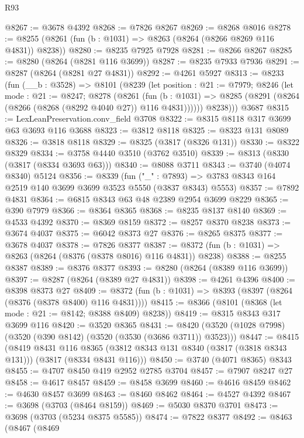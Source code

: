 \begin{lexlean}{R93}
\begin{coremodule}
@8267 := @3678 @4392
@8268 := @7826 @8267
@8269 := @8268 @8016
@8278 := @8255 (@8261 (fun (b : @1031) => @8263 (@8264 (@8266 @8269 @116 @4831)) @8238))
@8280 := @8235 @7925 @7928
@8281 := @8266 @8267
@8285 := @8280 (@8264 (@8281 @116 @3699))
@8287 := @8235 @7933 @7936
@8291 := @8287 (@8264 (@8281 @27 @4831))
@8292 := @4261 @5927
@8313 := @8233
    (fun (__b : @3528) =>
    @8101
      (@8239
        (let position : @21 := @7979;
        @8246
          (let mode : @21 := @8247;
          @8278
            (@8261
              (fun (b : @1031) =>
              @8285 (@8291 (@8264 (@8266 (@8268 (@8292 @4040 @27)) @116 @4831))))))
          @8238)))
    @3687
@8315 := LexLeanPreservation.conv_field @3708
@8322 := @8315 @8118 @317 @3699 @63 @3693 @116 @3688
@8323 := @3812 @8118
@8325 := @8323 @131 @8089
@8326 := @3818 @8118
@8329 := @8325 (@3817 (@8326 @131))
@8330 := @8322 @8329
@8334 := @3758 @4440 @3510 (@3762 @3510)
@8339 := @8313 (@8330 (@3817 (@8334 @3693 @63)))
@8340 := @8088 @3711
@8343 := @3740 (@4074 @8340) @5124
@8356 := @8339
    (fun ("_" : @7893) => @3783 @8343 @164 @2519 @140 @3699 @3699 @3523 @5550 (@3837 @8343) @5553)
@8357 := @7892 @4831
@8364 := @6815 @8343 @63 @48 @2389 @2954 @3699 @8229
@8365 := @390 @7979
@8366 := @8364 @8365
@8368 := @8235 @8137 @8140
@8369 := @4533 @4392
@8370 := @8369 @8159
@8372 := @8257 @8370 @8238
@8373 := @3674 @4037
@8375 := @6042 @8373 @27
@8376 := @8265 @8375
@8377 := @3678 @4037
@8378 := @7826 @8377
@8387 := @8372 (fun (b : @1031) => @8263 (@8264 (@8376 (@8378 @8016) @116 @4831)) @8238)
@8388 := @8255 @8387
@8389 := @8376 @8377
@8393 := @8280 (@8264 (@8389 @116 @3699))
@8397 := @8287 (@8264 (@8389 @27 @4831))
@8398 := @4261 @4396
@8400 := @8398 @8373 @27
@8409 := @8372 (fun (b : @1031) => @8393 (@8397 (@8264 (@8376 (@8378 @8400) @116 @4831))))
@8415 := @8366 (@8101 (@8368 (let mode : @21 := @8142; @8388 @8409) @8238))
@8419 := @8315 @8343 @317 @3699 @116
@8420 := @3520 @8365
@8431 := @8420 (@3520 (@1028 @7998) (@3520 (@390 @8142) (@3520 (@3530 (@3686 @3711)) @3523)))
@8447 := @8415
    (@8419
      @8431
      @116
      @8365
      (@3812 @8343 @131 @8340 (@3817 (@3818 @8343 @131)))
      (@3817 (@8334 @8431 @116)))
@8450 := @3740 (@4071 @8365) @8343
@8455 := @4707 @8450 @419 @2952 @2785 @3704
@8457 := @7907 @8247 @27
@8458 := @4617 @8457
@8459 := @8458 @3699
@8460 := @4616 @8459
@8462 := @4630 @8457 @3699
@8463 := @8460 @8462
@8464 := @4527 @4392
@8467 := @3698 (@3703 (@8464 @8159))
@8469 := @5030 @8370 @3701
@8473 := @3698 (@3703 (@5234 @8375 @5585))
@8474 := @7822 @8377
@8492 := @8463
    (@8467
      (@8469

\end{coremodule}
\end{lexlean}
